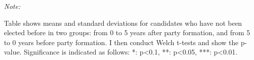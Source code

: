 \begin{table}[!h]
{\begin{threeparttable}
\begin{tabular}[t]{lllllll}
\bottomrule
\end{tabular}
\begin{tablenotes}[para]
\item \textit{Note: } 
\item Table shows means and standard deviations for candidates who have not been elected before in two groups: from 0 to 5 years after party formation, and from 5 to 0 years before party formation. I then conduct Welch t-tests and show the p-value. Significance is indicated as follows: *: p<0.1, **: p<0.05, ***: p<0.01.
\end{tablenotes}
\end{threeparttable}}
\end{table}
